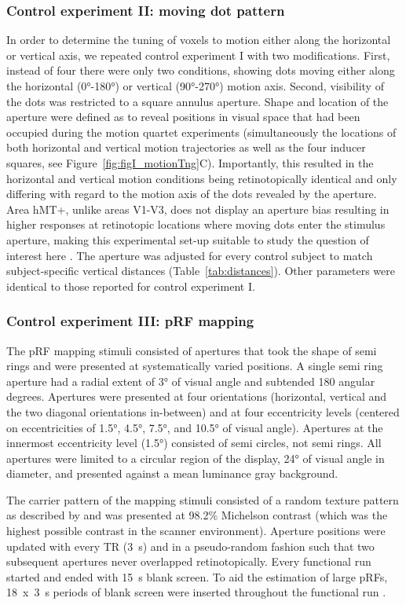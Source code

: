 \subsubsection{Control experiment II: moving dot pattern}
In order to determine the tuning of voxels to motion either along the horizontal or vertical axis, we repeated control experiment I with two modifications. First, instead of four there were only two conditions, showing dots moving either along the horizontal (0°-180°) or vertical (90°-270°) motion axis. Second, visibility of the dots was restricted to a square annulus aperture. Shape and location of the aperture were defined as to reveal positions in visual space that had been occupied during the motion quartet experiments (simultaneously the locations of both horizontal and vertical motion trajectories as well as the four inducer squares, see Figure~\ref{fig:figI_motionTng}C). Importantly, this resulted in the horizontal and vertical motion conditions being retinotopically identical and only differing with regard to the motion axis of the dots revealed by the aperture. Area hMT+, unlike areas V1-V3, does not display an aperture bias resulting in higher responses at retinotopic locations where moving dots enter the stimulus aperture, making this experimental set-up suitable to study the question of interest here \parencite{Wang2014}. The aperture was adjusted for every control subject to match subject-specific vertical distances (Table~\ref{tab:distances}). Other parameters were identical to those reported for control experiment I.

\subsubsection{Control experiment III: pRF mapping}
The pRF mapping stimuli consisted of apertures that took the shape of semi rings and were presented at systematically varied positions. A single semi ring aperture had a radial extent of 3° of visual angle and subtended 180 angular degrees. Apertures were presented at four orientations (horizontal, vertical and the two diagonal orientations in-between) and at four eccentricity levels (centered on eccentricities of 1.5°, 4.5°, 7.5°, and 10.5° of visual angle). Apertures at the innermost eccentricity level (1.5°) consisted of semi circles, not semi rings. All apertures were limited to a circular region of the display, 24° of visual angle in diameter, and presented against a mean luminance gray background.

The carrier pattern of the mapping stimuli consisted of a random texture pattern as described by \cite{Kolster2010} and was presented at 98.2\% Michelson contrast (which was the highest possible contrast in the scanner environment). Aperture positions were updated with every TR (3~s) and in a pseudo-random fashion such that two subsequent apertures never overlapped retinotopically. Every functional run started and ended with 15~s blank screen. To aid the estimation of large pRFs, 18~x~3~s periods of blank screen were inserted throughout the functional run \parencite{Amano2009}.

